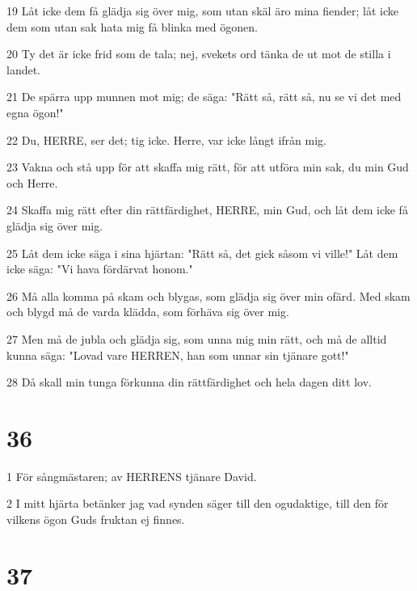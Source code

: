 \par 19 Låt icke dem få glädja sig över mig, som utan skäl äro mina fiender; låt icke dem som utan sak hata mig få blinka med ögonen.
\par 20 Ty det är icke frid som de tala; nej, svekets ord tänka de ut mot de stilla i landet.
\par 21 De spärra upp munnen mot mig; de säga: "Rätt så, rätt så, nu se vi det med egna ögon!"
\par 22 Du, HERRE, ser det; tig icke. Herre, var icke långt ifrån mig.
\par 23 Vakna och stå upp för att skaffa mig rätt, för att utföra min sak, du min Gud och Herre.
\par 24 Skaffa mig rätt efter din rättfärdighet, HERRE, min Gud, och låt dem icke få glädja sig över mig.
\par 25 Låt dem icke säga i sina hjärtan: "Rätt så, det gick såsom vi ville!" Låt dem icke säga: "Vi hava fördärvat honom."
\par 26 Må alla komma på skam och blygas, som glädja sig över min ofärd. Med skam och blygd må de varda klädda, som förhäva sig över mig.
\par 27 Men må de jubla och glädja sig, som unna mig min rätt, och må de alltid kunna säga: "Lovad vare HERREN, han som unnar sin tjänare gott!"
\par 28 Då skall min tunga förkunna din rättfärdighet och hela dagen ditt lov.

\chapter{36}

\par 1 För sångmästaren; av HERRENS tjänare David.
\par 2 I mitt hjärta betänker jag vad synden säger till den ogudaktige, till den för vilkens ögon Guds fruktan ej finnes.

\chapter{37}

